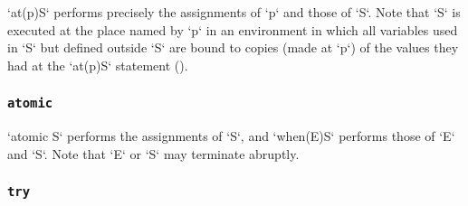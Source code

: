 
\xcd`at(p)S` performs precisely the assignments of \xcd`p` and those
of \xcd`S`. Note that \xcd`S` is executed at the place named by
\xcd`p` in an environment in which all variables used in \xcd`S` but
defined outside \xcd`S` are bound to copies (made at \xcd`p`) of the
values they had at the \xcd`at(p)S` statement ().


\subsubsection{{\tt atomic}}

\xcd`atomic S` performs the assignments of \xcd`S`, 
and \xcd`when(E)S` performs those of \xcd`E` and \xcd`S`.  Note that
\xcd`E` or \xcd`S` may terminate abruptly.

\subsubsection{{\tt try}}

